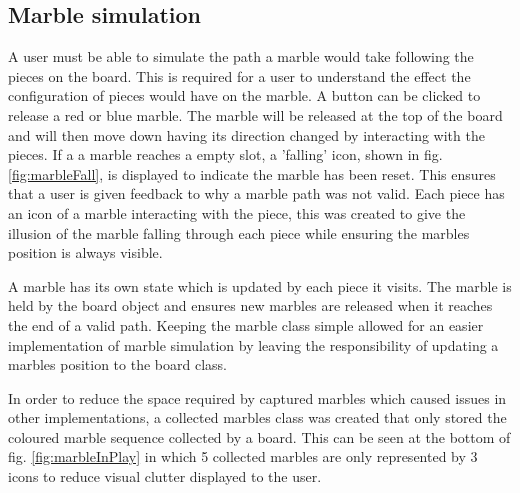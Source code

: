 \documentclass{l4proj}
\begin{document}
\subsection{Marble simulation}
A user must be able to simulate the path a marble would take following the pieces on the board. This is required for a user to understand the effect the configuration of pieces would have on the marble. A button can be clicked to release a red or blue marble. The marble will be released at the top of the board and will then move down having its direction changed by interacting with the pieces. If a a marble reaches a empty slot, a 'falling' icon, shown in fig. \ref{fig:marbleFall}, is displayed to indicate the marble has been reset. This ensures that a user is given feedback to why a marble path was not valid. Each piece has an icon of a marble interacting with the piece, this was created to give the illusion of the marble falling through each piece while ensuring the marbles position is always visible.

A marble has its own state which is updated by each piece it visits. The marble is held by the board object and ensures new marbles are released when it reaches the end of a valid path. Keeping the marble class simple allowed for an easier implementation of marble simulation by leaving the responsibility of updating a marbles position to the board class. 


In order to reduce the space required by captured marbles which caused issues in other implementations, a collected marbles class was created that only stored the coloured marble sequence collected by a board. This can be seen at the bottom of fig. \ref{fig:marbleInPlay} in which 5 collected marbles are only represented by 3 icons to reduce visual clutter displayed to the user.
\end{document}
